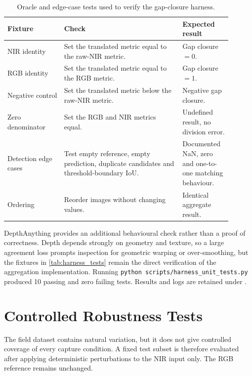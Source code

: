 \begin{table}[!htbp]
\centering
\footnotesize
\begin{tabular}{p{0.23\linewidth}p{0.48\linewidth}p{0.19\linewidth}}
\hline
\textbf{Fixture} & \textbf{Check} & \textbf{Expected result} \\
\hline
NIR identity & Set the translated metric equal to the raw-NIR metric. & Gap closure $=0$. \\
RGB identity & Set the translated metric equal to the RGB metric. & Gap closure $=1$. \\
Negative control & Set the translated metric below the raw-NIR metric. & Negative gap closure. \\
Zero denominator & Set the RGB and NIR metrics equal. & Undefined result, no division error. \\
Detection edge cases & Test empty reference, empty prediction, duplicate candidates and threshold-boundary IoU. & Documented NaN, zero and one-to-one matching behaviour. \\
Ordering & Reorder images without changing values. & Identical aggregate result. \\
\hline
\end{tabular}
\caption{Oracle and edge-case tests used to verify the gap-closure harness.}
\label{tab:harness_tests}
\end{table}

DepthAnything provides an additional behavioural check rather than a proof of correctness. Depth depends strongly on geometry and texture, so a large agreement loss prompts inspection for geometric warping or over-smoothing, but the fixtures in \autoref{tab:harness_tests} remain the direct verification of the aggregation implementation. Running \texttt{python scripts/harness\_unit\_tests.py} produced 10 passing and zero failing tests. Results and logs are retained under .


\section{Controlled Robustness Tests}
\label{sec:test_robustness}

The field dataset contains natural variation, but it does not give controlled coverage of every capture condition. A fixed test subset is therefore evaluated after applying deterministic perturbations to the NIR input only. The RGB reference remains unchanged.


